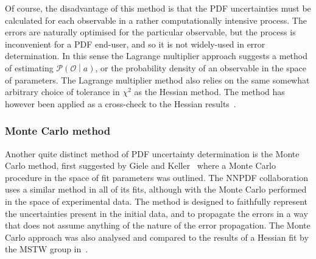 Of course, the disadvantage of this method is that the PDF uncertainties must be calculated for each observable in a rather computationally intensive process. The errors are naturally optimised for the particular observable, but the process is inconvenient for a PDF end-user, and so it is not widely-used in error determination. In this sense the Lagrange multiplier approach suggests a method of estimating $\mathcal{P}\left(\mathcal{O} \middle| a \right)$, or the probability density of an observable in the space of parameters. The Lagrange multiplier method also relies on the same somewhat arbitrary choice of tolerance in $\chi^2$ as the Hessian method. The method has however been applied as a cross-check to the Hessian results~\cite{Pumplin:2000vx,Martin:2002aw}.

\subsubsection{Monte Carlo method}
Another quite distinct method of PDF uncertainty determination is the Monte Carlo method, first suggested by Giele and Keller~\cite{Giele:1998gw,Giele:2001mr} where a Monte Carlo procedure in the space of fit parameters was outlined. The NNPDF collaboration uses a similar method in all of its fits, although with the Monte Carlo performed in the space of experimental data. The method is designed to faithfully represent the uncertainties present in the initial data, and to propagate the errors in a way that does not assume anything of the nature of the error propagation. The Monte Carlo approach was also analysed and compared to the results of a Hessian fit by the MSTW group in~\cite{Watt:2012tq}.


